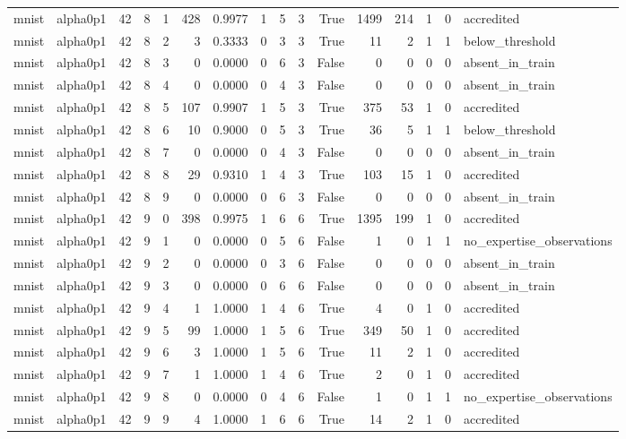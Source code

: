 \begin{tabular}{llrrrrrrrrrrrrrl}
mnist & alpha0p1 & 42 & 8 & 1 & 428 & 0.9977 & 1 & 5 & 3 & True & 1499 & 214 & 1 & 0 & accredited \\
mnist & alpha0p1 & 42 & 8 & 2 & 3 & 0.3333 & 0 & 3 & 3 & True & 11 & 2 & 1 & 1 & below\_threshold \\
mnist & alpha0p1 & 42 & 8 & 3 & 0 & 0.0000 & 0 & 6 & 3 & False & 0 & 0 & 0 & 0 & absent\_in\_train \\
mnist & alpha0p1 & 42 & 8 & 4 & 0 & 0.0000 & 0 & 4 & 3 & False & 0 & 0 & 0 & 0 & absent\_in\_train \\
mnist & alpha0p1 & 42 & 8 & 5 & 107 & 0.9907 & 1 & 5 & 3 & True & 375 & 53 & 1 & 0 & accredited \\
mnist & alpha0p1 & 42 & 8 & 6 & 10 & 0.9000 & 0 & 5 & 3 & True & 36 & 5 & 1 & 1 & below\_threshold \\
mnist & alpha0p1 & 42 & 8 & 7 & 0 & 0.0000 & 0 & 4 & 3 & False & 0 & 0 & 0 & 0 & absent\_in\_train \\
mnist & alpha0p1 & 42 & 8 & 8 & 29 & 0.9310 & 1 & 4 & 3 & True & 103 & 15 & 1 & 0 & accredited \\
mnist & alpha0p1 & 42 & 8 & 9 & 0 & 0.0000 & 0 & 6 & 3 & False & 0 & 0 & 0 & 0 & absent\_in\_train \\
mnist & alpha0p1 & 42 & 9 & 0 & 398 & 0.9975 & 1 & 6 & 6 & True & 1395 & 199 & 1 & 0 & accredited \\
mnist & alpha0p1 & 42 & 9 & 1 & 0 & 0.0000 & 0 & 5 & 6 & False & 1 & 0 & 1 & 1 & no\_expertise\_observations \\
mnist & alpha0p1 & 42 & 9 & 2 & 0 & 0.0000 & 0 & 3 & 6 & False & 0 & 0 & 0 & 0 & absent\_in\_train \\
mnist & alpha0p1 & 42 & 9 & 3 & 0 & 0.0000 & 0 & 6 & 6 & False & 0 & 0 & 0 & 0 & absent\_in\_train \\
mnist & alpha0p1 & 42 & 9 & 4 & 1 & 1.0000 & 1 & 4 & 6 & True & 4 & 0 & 1 & 0 & accredited \\
mnist & alpha0p1 & 42 & 9 & 5 & 99 & 1.0000 & 1 & 5 & 6 & True & 349 & 50 & 1 & 0 & accredited \\
mnist & alpha0p1 & 42 & 9 & 6 & 3 & 1.0000 & 1 & 5 & 6 & True & 11 & 2 & 1 & 0 & accredited \\
mnist & alpha0p1 & 42 & 9 & 7 & 1 & 1.0000 & 1 & 4 & 6 & True & 2 & 0 & 1 & 0 & accredited \\
mnist & alpha0p1 & 42 & 9 & 8 & 0 & 0.0000 & 0 & 4 & 6 & False & 1 & 0 & 1 & 1 & no\_expertise\_observations \\
mnist & alpha0p1 & 42 & 9 & 9 & 4 & 1.0000 & 1 & 6 & 6 & True & 14 & 2 & 1 & 0 & accredited \\

\end{tabular}
